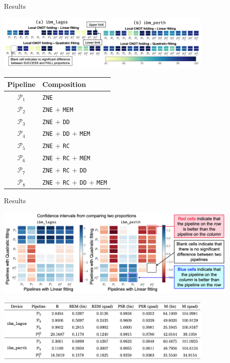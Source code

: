 \documentclass[11pt,aspectratio=1610,xcolor=dvipsnames]{beamer}
\begin{document}
\begin{frame}{Results}
	\begin{center}
		\includegraphics[width=0.8\textwidth]{results.png}
	\end{center}
	\begin{table}[h]
		\centering\begin{tabular}{c l}
			Pipeline        & Composition                                             \\ \toprule
			$\mathcal{P}_1$ & \texttt{ZNE}                                            \\
			$\mathcal{P}_2$ & \texttt{ZNE} + \texttt{MEM}                             \\
			$\mathcal{P}_3$ & \texttt{ZNE} + \texttt{DD}                              \\
			$\mathcal{P}_4$ & \texttt{ZNE} + \texttt{DD} + \texttt{MEM}               \\
			$\mathcal{P}_5$ & \texttt{ZNE} + \texttt{RC}                              \\
			$\mathcal{P}_6$ & \texttt{ZNE} + \texttt{RC} + \texttt{MEM}               \\
			$\mathcal{P}_7$ & \texttt{ZNE} + \texttt{RC} + \texttt{DD}                \\
			$\mathcal{P}_8$ & \texttt{ZNE} + \texttt{RC} + \texttt{DD} + \texttt{MEM}
		\end{tabular}
	\end{table}
\end{frame}

\begin{frame}{Results}
	\begin{center}
		\includegraphics[width=0.9\textwidth]{comparisons.png}

		\includegraphics[width=0.8\textwidth]{table.png}
	\end{center}
\end{frame}
\end{document}
